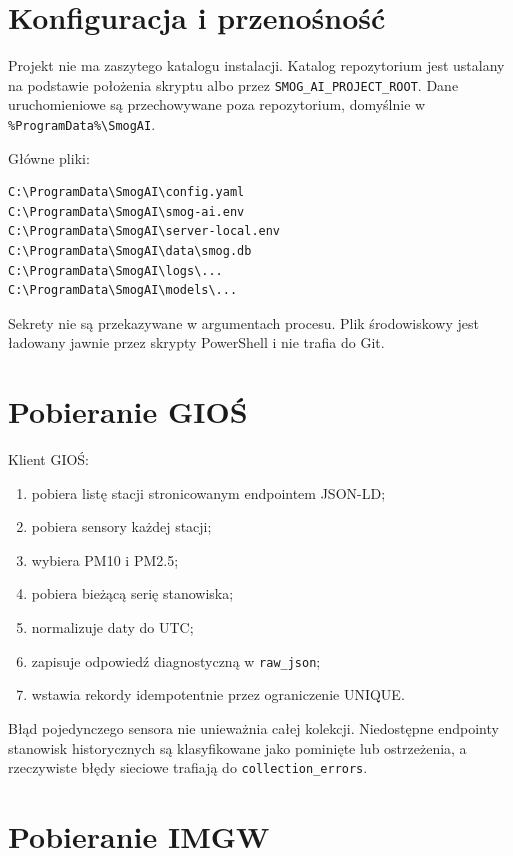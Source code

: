 \documentclass[11pt,a4paper,oneside]{article}
\begin{document}
\section{Konfiguracja i przenośność}

Projekt nie ma zaszytego katalogu instalacji. Katalog repozytorium jest
ustalany na podstawie położenia skryptu albo przez
\texttt{SMOG\_AI\_PROJECT\_ROOT}. Dane uruchomieniowe są przechowywane poza
repozytorium, domyślnie w \texttt{\%ProgramData\%\textbackslash SmogAI}.

Główne pliki:
\begin{lstlisting}[style=code]
C:\ProgramData\SmogAI\config.yaml
C:\ProgramData\SmogAI\smog-ai.env
C:\ProgramData\SmogAI\server-local.env
C:\ProgramData\SmogAI\data\smog.db
C:\ProgramData\SmogAI\logs\...
C:\ProgramData\SmogAI\models\...
\end{lstlisting}

Sekrety nie są przekazywane w argumentach procesu. Plik środowiskowy jest
ładowany jawnie przez skrypty PowerShell i nie trafia do Git.

\section{Pobieranie GIOŚ}

Klient GIOŚ:
\begin{enumerate}
  \item pobiera listę stacji stronicowanym endpointem JSON-LD;
  \item pobiera sensory każdej stacji;
  \item wybiera PM10 i PM2.5;
  \item pobiera bieżącą serię stanowiska;
  \item normalizuje daty do UTC;
  \item zapisuje odpowiedź diagnostyczną w \texttt{raw\_json};
  \item wstawia rekordy idempotentnie przez ograniczenie UNIQUE.
\end{enumerate}

Błąd pojedynczego sensora nie unieważnia całej kolekcji. Niedostępne endpointy
stanowisk historycznych są klasyfikowane jako pominięte lub ostrzeżenia, a
rzeczywiste błędy sieciowe trafiają do \texttt{collection\_errors}.

\section{Pobieranie IMGW}
\end{document}
